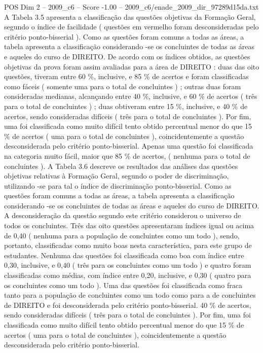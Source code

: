 \begin{textsample}{POS Dim 2 – 2009\_c6 – Score -1.00 – 2009\_c6/enade\_2009\_dir\_97289d15da.txt}
A Tabela 3.5 apresenta a classificação das questões objetivas da Formação Geral, segundo o índice de facilidade ( questões em vermelho foram desconsideradas pelo critério ponto-bisserial ).
Como as questões foram comuns a todas as áreas, a tabela apresenta a classificação considerando -se os concluintes de todas as áreas e aqueles do curso de DIREITO.
De acordo com os índices obtidos, as questões objetivas da prova foram assim avaliadas para a área de DIREITO : duas das oito questões, tiveram entre 60 \%, inclusive, e 85 \% de acertos e foram classificadas como fáceis ( somente uma para o total de concluintes ) ; outras duas foram consideradas medianas, alcançando entre 40 \%, inclusive, e 60 \% de acertos ( três para o total de concluintes ) ; duas obtiveram entre 15 \%, inclusive, e 40 \% de acertos, sendo consideradas difíceis ( três para o total de concluintes ).
Por fim, uma foi classificada como muito difícil tento obtido percentual menor do que 15 \% de acertos ( uma para o total de concluintes ), coincidentemente a questão desconsiderada pelo critério ponto-bisserial.
Apenas uma questão foi classificada na categoria muito fácil, maior que 85 \% de acertos, ( nenhuma para o total de concluintes ).
A Tabela 3.6 descreve os resultados das análises das questões objetivas relativas à Formação Geral, segundo o poder de discriminação, utilizando -se para tal o índice de discriminação ponto-bisserial.
Como as questões foram comuns a todas as áreas, a tabela apresenta a classificação considerando -se os concluintes de todas as áreas e aqueles do curso de DIREITO.
A desconsideração da questão segundo este critério considerou o universo de todos os concluintes.
Três das oito questões apresentaram índices igual ou acima de 0,40 ( nenhuma para a população de concluintes como um todo ), sendo, portanto, classificadas como muito boas nesta característica, para este grupo de estudantes.
Nenhuma das questões foi classificada como boa com índice entre 0,30, inclusive, e 0,40 ( três para os concluintes como um todo ) e quatro foram classificadas como médias, com índice entre 0,20, inclusive, e 0,30 ( quatro para os concluintes como um todo ).
Uma das questões foi classificada como fraca tanto para a população de concluintes como um todo como para a de concluintes de DIREITO e foi desconsiderada pelo critério ponto-bisserial. 40 \% de acertos, sendo consideradas difíceis ( três para o total de concluintes ).
Por fim, uma foi classificada como muito difícil tento obtido percentual menor do que 15 \% de acertos ( uma para o total de concluintes ), coincidentemente a questão desconsiderada pelo critério ponto-bisserial.

\end{textsample}
